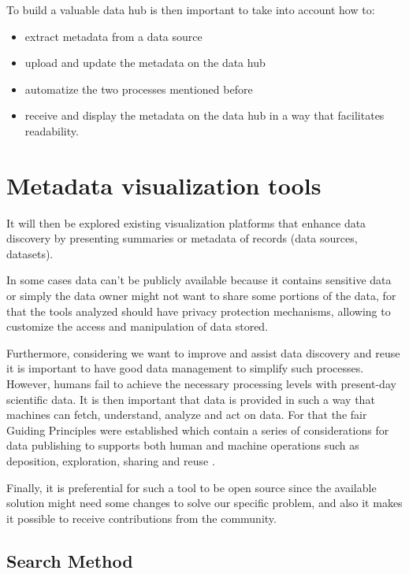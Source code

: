To build a valuable data hub is then important to take into account how to:
\begin{itemize}
    \item extract metadata from a data source
    \item upload and update the metadata on the data hub
    \item automatize the two processes mentioned before
    \item receive and display the metadata on the data hub in a way that facilitates
        readability.
\end{itemize}

\section{Metadata visualization tools}
It will then be explored existing visualization platforms that enhance data discovery
by presenting summaries or metadata of records (data sources, datasets).

In some cases data can't be publicly available because it contains sensitive data or
simply the data owner might not want to share some portions of the data, for that the
tools analyzed should have privacy protection mechanisms, allowing to customize the
access and manipulation of data stored.

Furthermore, considering we want to improve and assist data discovery and reuse it is
important to have good data management to simplify such processes.
However, humans fail to achieve the necessary processing levels with present-day
scientific data.
It is then important that data is provided in such a way that machines can fetch,
understand, analyze and act on data.
For that the \gls{fair} Guiding Principles were established which contain a series of
considerations for data publishing to supports both human and machine operations such
as deposition, exploration, sharing and reuse \cite{fair}.

Finally, it is preferential for such a tool to be open source since the available
solution might need some changes to solve our specific problem, and also it makes it
possible to receive contributions from the community.

\subsection{Search Method}


